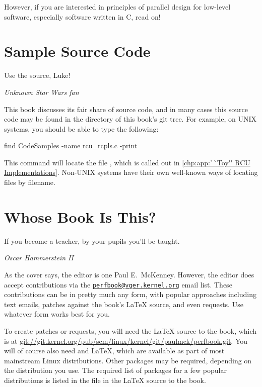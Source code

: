 However, if you are interested in principles of parallel design
for low-level software, especially software written in C, read on!

\section{Sample Source Code}
\label{sec:howto:Sample Source Code}
%
\epigraph{Use the source, Luke!}{\emph{Unknown Star Wars fan}}

This book discusses its fair share of source code, and in many cases
this source code may be found in the  directory
of this book's git tree.
For example, on UNIX systems, you should be able to type the following:

\begin{VerbatimU}
find CodeSamples -name rcu_rcpls.c -print
\end{VerbatimU}

This command will locate the file , which is called out in
\cref{chp:app:``Toy'' RCU Implementations}.
Non-UNIX systems have their own well-known ways of locating files by filename.

\section{Whose Book Is This?}
\label{sec:howto:Whose Book Is This?}
%
\epigraph{If you become a teacher, by your pupils you'll be taught.}
	 {\emph{Oscar Hammerstein II}}

As the cover says, the editor is one Paul E.~McKenney.
However, the editor does accept contributions via the
\href{mailto:perfbook@vger.kernel.org}
{\nolinkurl{perfbook@vger.kernel.org}} email list.
These contributions can be in pretty much any form, with popular
approaches including text emails,
patches against the book's \LaTeX{} source, and even  requests.
Use whatever form works best for you.

To create patches or  requests, you will need the
\LaTeX{} source to the book, which is at
\url{git://git.kernel.org/pub/scm/linux/kernel/git/paulmck/perfbook.git}.
You will of course also need  and \LaTeX{}, which are
available as part of most mainstream Linux distributions.
Other packages may be required, depending on the distribution you use.
The required list of packages for a few popular distributions is listed
in the file  in the \LaTeX{} source to the book.

